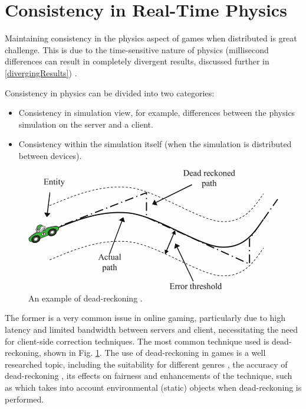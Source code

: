 \section{Consistency in Real-Time Physics} \label{ConsistencyRealTimePhysics}


Maintaining consistency in the physics aspect of games when distributed is great challenge. This is due to the time-sensitive nature of physics (millisecond differences can result in completely divergent results, discussed further in \ref{divergingResults}) \cite{2012EnhancedDeadReckoning}.

Consistency in physics can be divided into two categories:
\begin{itemize}
\item Consistency in simulation view, for example, differences between the physics simulation on the server and a client.
\item Consistency within the simulation itself (when the simulation is distributed between devices).
\end{itemize}

\begin{figure}
	\centering
	\includegraphics[width=\textwidth]{Figs/DeadReckoning}
	\caption{An example of dead-reckoning \cite{2012EnhancedDeadReckoning}.}
	\label{fig_DeadReckoning}
\end{figure}

The former is a very common issue in online gaming, particularly due to high latency and limited bandwidth between servers and client, necessitating the need for client-side correction techniques. The most common technique used is dead-reckoning, shown in Fig. \ref{fig_DeadReckoning}. The use of dead-reckoning in games is a well researched topic, including the suitability for different genres \cite{2002DeadReckoningSuitability}, the accuracy of dead-reckoning \cite{2004AccuracyDeadReckoning}, its effects on fairness \cite{2005FairnessDeadReckoning} and enhancements of the technique, such as \cite{2012EnhancedDeadReckoning} which takes into account environmental (static) objects when dead-reckoning is performed.

